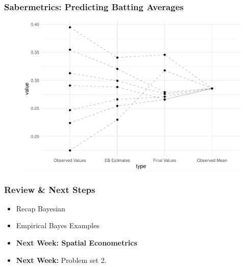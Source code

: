 \documentclass[
  shownotes,
  xcolor={svgnames},
  hyperref={colorlinks,citecolor=DarkBlue,linkcolor=DarkRed,urlcolor=DarkBlue}
  , aspectratio=169]{beamer}
\begin{document}
\begin{frame}[fragile]
\frametitle{Sabermetrics: Predicting Batting Averages}

\begin{figure}[H] \centering
  \centering
  \includegraphics[scale=0.5]{figures/shrinkage_future}
  \\
  \tiny 
\end{figure}



\end{frame}
\begin{frame}
\frametitle{Review \& Next Steps}
  
  \begin{itemize} 
    \item Recap Bayesian
    \medskip
    \item Empirical Bayes Examples
    
  \bigskip  

  \item  {\bf Next Week: Spatial Econometrics} 
  \bigskip
  \item  {\bf Next Week:} Problem set 2. 
  \bigskip
  
  
  
  \end{itemize}


\end{frame}


\end{document}
